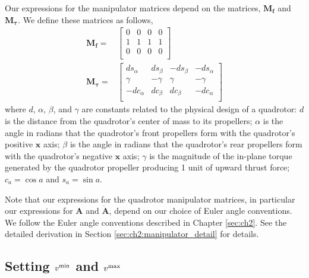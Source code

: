 Our expressions for the manipulator matrices depend on the matrices, $\mathbf{M}_{\mathbf{f}}$ and $\mathbf{M}_{\mathbf{\tau}}$.
We define these matrices as follows, 
%
\begin{equation}
\begin{aligned}
%
\mathbf{M}_{\mathbf{f}} = &
\begin{bmatrix}
0 & 0 & 0 & 0 \\
1 & 1 & 1 & 1 \\
0 & 0 & 0 & 0 \\
\end{bmatrix}\\
%
\mathbf{M}_{\mathbf{\tau}} = &
\begin{bmatrix}
 ds_\alpha & ds_\beta & -ds_\beta & -ds_\alpha \\
\gamma     & -\gamma  & \gamma    & -\gamma    \\
-dc_\alpha & dc_\beta & dc_\beta  & -dc_\alpha \\
\end{bmatrix}
%
\end{aligned}
\end{equation}
%
where $d$, $\alpha$, $\beta$, and $\gamma$ are constants related to the physical design of a quadrotor:
$d$ is the distance from the quadrotor's center of mass to its propellers;
$\alpha$ is the angle in radians that the quadrotor's front propellers form with the quadrotor's positive $\mathbf{x}$ axis;
$\beta$ is the angle in radians that the quadrotor's rear propellers form with the quadrotor's negative $\mathbf{x}$ axis;
$\gamma$ is the magnitude of the in-plane torque generated by the quadrotor propeller producing 1 unit of upward thrust force;
$c_a=\cos a$ and $s_a=\sin a$.

Note that our expressions for the quadrotor manipulator matrices, in particular our expressions for $\mathbf{A}$ and $\mathbf{\dot{A}}$, depend on our choice of Euler angle conventions.
We follow the Euler angle conventions described in Chapter \ref{sec:ch2}.
See the detailed derivation in Section \ref{sec:ch2:manipulator_detail} for details.

\subsection{Setting $v^{\text{\textrm{\textmd{min}}}}$ and $v^{\text{\textrm{\textmd{max}}}}$}
\label{sec:ch3:v_min_v_max}

